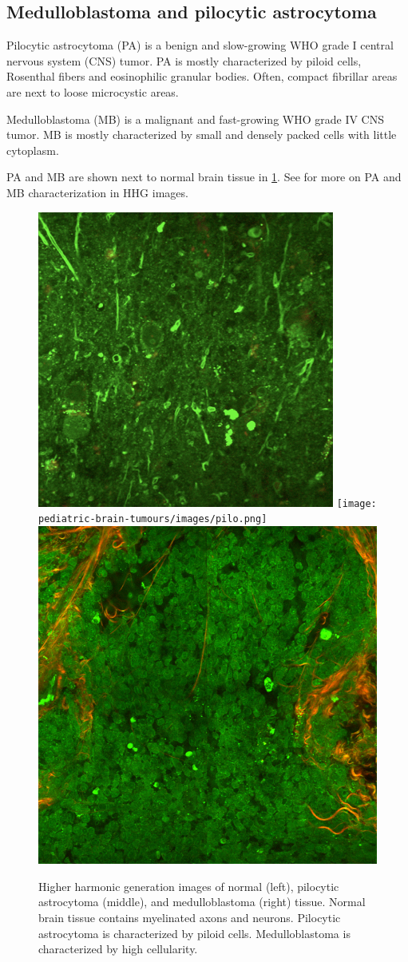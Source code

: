 \subsection{Medulloblastoma and pilocytic astrocytoma}
Pilocytic astrocytoma (PA) is a benign and slow-growing WHO grade I central nervous system (CNS) tumor.
PA is mostly characterized by piloid cells, Rosenthal fibers and eosinophilic granular bodies.
Often, compact fibrillar areas are next to loose microcystic areas.

Medulloblastoma (MB) is a malignant and fast-growing WHO grade IV CNS tumor.
MB is mostly characterized by small and densely packed cells with little cytoplasm.

PA and MB are shown next to normal brain tissue in \cref{fig:normal-pa-mb}.
See \citeauthor{Spies2023}  for more on PA and MB characterization in HHG images.

\begin{figure}
    \includegraphics[width=0.3\linewidth]{pediatric-brain-tumours/images/normal.png}
    \texttt{[image: pediatric-brain-tumours/images/pilo.png]}
    \includegraphics[width=0.3\linewidth]{pediatric-brain-tumours/images/medullo.png}
    \caption[Normal, pilocytic astrocytoma, and medulloblastoma HHG images.]{
        Higher harmonic generation images of normal (left), pilocytic astrocytoma (middle), and medulloblastoma (right) tissue.
        Normal brain tissue contains myelinated axons and neurons.
        Pilocytic astrocytoma is characterized by piloid cells.
        Medulloblastoma is characterized by high cellularity.
    }
    \label{fig:normal-pa-mb}
\end{figure}
